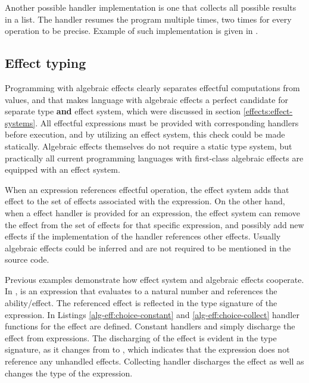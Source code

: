Another possible handler implementation is one that collects all possible results in a list.
The handler resumes the program multiple times, two times for every  operation to be precise. Example of such implementation is given in .




\subsection{Effect typing}
Programming with algebraic effects clearly separates effectful computations from values, and that makes language with algebraic effects a perfect candidate for separate type \textbf{and} effect system, which were discussed in section \ref{effects:effect-systems}. All effectful expressions must be provided with corresponding handlers before execution, and by utilizing an effect system, this check could be made statically. Algebraic effects themselves do not require a static type system, but practically all current programming languages with first-class algebraic effects are equipped with an effect system.

When an expression references effectful operation, the effect system adds that effect to the set of effects associated with the expression. On the other hand, when a effect handler is provided for an expression, the effect system can remove the effect from the set of effects for that specific expression, and possibly add new effects if the implementation of the handler references other effects. Usually algebraic effects could be inferred and are not required to be mentioned in the source code.

Previous examples demonstrate how effect system and algebraic effects cooperate. In ,  is an expression that evaluates to a natural number and references the  ability/effect. The referenced effect is reflected in the type signature of the expression. In Listings \ref{alg-eff:choice-constant} and \ref{alg-eff:choice-collect} handler functions for the  effect are defined. Constant handlers  and  simply discharge the effect from expressions. The discharging of the effect is evident in the type signature, as it changes from  to , which indicates that the expression does not reference any unhandled effects. Collecting handler  discharges the effect as well as changes the type of the expression.

